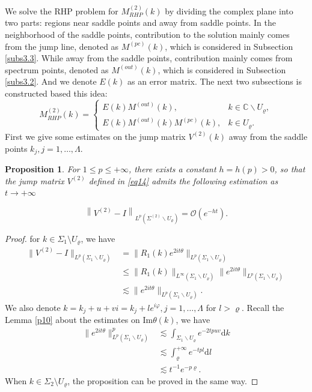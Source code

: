 \documentclass[11pt]{article}
\numberwithin{equation}{section}
\newtheorem{Proposition}{Proposition}
\begin{document}
We solve the RHP problem for $M^{(2)}_{RHP}(k)$ by dividing the complex plane into two parts: regions near saddle points and away from saddle points. In the neighborhood of the saddle points, contribution to the solution mainly comes from the jump line, denoted as $M^{(pc)}(k)$, which is considered in Subsection \ref{subs3.3}. While away from the saddle points, contribution mainly comes from spectrum points, denoted as $M^{(out)}(k)$, which is considered in Subsection \ref{subs3.2}. And we denote $E(k)$ as an error matrix. The next two subsections is constructed based this idea:
\begin{equation}\label{eq28}
    M_{R H P}^{(2)}(k)= \begin{cases}E(k) M^{(o u t)}(k), & k \in \mathbb{C} \backslash U_\varrho ,\\ E(k) M^{(o u t)}(k) M^{(pc)}\left(k\right), & k \in U_{\varrho}.\end{cases}
\end{equation}
First we give some estimates on the jump matrix $V^{(2)}(k)$ away from the saddle points $k_j,j=1,\dots,\Lambda.$
\begin{Proposition}\label{p12}
    For $1 \leqslant p \leqslant+\infty$, there exists a constant $h=h(p)>0$, so that the jump matrix $V^{(2)}$ defined in \eqref{eq14} admits the following estimation as $t \rightarrow+\infty$

$$
\left\|V^{(2)}-I\right\|_{L^p\left(\Sigma^{(2)}\backslash U_{\varrho}\right)}=\mathcal{O}\left(e^{-h t}\right).
$$

\end{Proposition}
\begin{proof}
    for $k\in\Sigma_1\setminus U_\varrho$, we have
\begin{align*}
\|V^{(2)}-I\|_{L^p\left(\Sigma_1\backslash U_{\varrho}\right)}&=\|R_1(k)e^{2it\theta}\|_{L^p\left(\Sigma_1\backslash U_{\varrho}\right)}\\
&\leqslant \|R_1(k)\|_{L^\infty\left(\Sigma_1\backslash U_{\varrho}\right)}\|e^{2it\theta}\|_{L^p\left(\Sigma_1\backslash U_{\varrho}\right)}\\
&\lesssim \|e^{2it\theta}\|_{L^p\left(\Sigma_1\backslash U_{\varrho}\right)}.
\end{align*}
We also denote $k=k_j+u+vi=k_j+le^{i\varphi},j=1,\dots,\Lambda$ for $l>\varrho$. Recall the Lemma \ref{p10} about the estimates on $\mathrm{Im}\theta(k)$, we have
\begin{align*}
    \|e^{2it\theta}\|^p_{L^p\left(\Sigma_1\backslash U_{\varrho}\right)}&\lesssim\int_{\Sigma_1\backslash U_{\varrho}}e^{-2tpuv}\mathrm{d}k\\
    &\lesssim\int_\varrho^{+\infty}e^{-tpl}\mathrm{d}l\\
    &\lesssim t^{-1}e^{-p\varrho}.
\end{align*}
 When $k\in\Sigma_2\setminus U_\varrho$, the proposition can be proved in the same way.
\end{proof}
\end{document}
